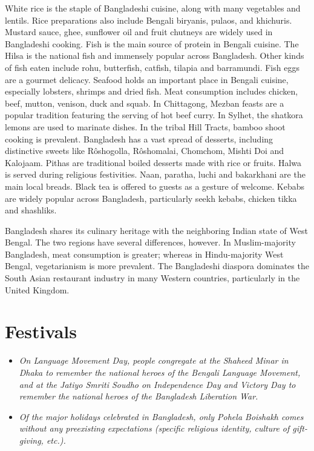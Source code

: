 White rice is the staple of Bangladeshi cuisine, along with many
vegetables and lentils. Rice preparations also include Bengali biryanis,
pulaos, and khichuris. Mustard sauce, ghee, sunflower oil and fruit
chutneys are widely used in Bangladeshi cooking. Fish is the main source
of protein in Bengali cuisine. The Hilsa is the national fish and
immensely popular across Bangladesh. Other kinds of fish eaten include
rohu, butterfish, catfish, tilapia and barramundi. Fish eggs are a
gourmet delicacy. Seafood holds an important place in Bengali cuisine,
especially lobsters, shrimps and dried fish. Meat consumption includes
chicken, beef, mutton, venison, duck and squab. In Chittagong, Mezban
feasts are a popular tradition featuring the serving of hot beef curry.
In Sylhet, the shatkora lemons are used to marinate dishes. In the
tribal Hill Tracts, bamboo shoot cooking is prevalent. Bangladesh has a
vast spread of desserts, including distinctive sweets like Rôshogolla,
Rôshomalai, Chomchom, Mishti Doi and Kalojaam. Pithas are traditional
boiled desserts made with rice or fruits. Halwa is served during
religious festivities. Naan, paratha, luchi and bakarkhani are the main
local breads. Black tea is offered to guests as a gesture of welcome.
Kebabs are widely popular across Bangladesh, particularly seekh kebabs,
chicken tikka and shashliks.

Bangladesh shares its culinary heritage with the neighboring Indian
state of West Bengal. The two regions have several differences, however.
In Muslim-majority Bangladesh, meat consumption is greater; whereas in
Hindu-majority West Bengal, vegetarianism is more prevalent. The
Bangladeshi diaspora dominates the South Asian restaurant industry in
many Western countries, particularly in the United Kingdom.

\section{Festivals}\label{festivals}

\begin{itemize}
\item
  \emph{On Language Movement Day, people congregate at the Shaheed Minar
  in Dhaka to remember the national heroes of the Bengali Language
  Movement, and at the Jatiyo Smriti Soudho on Independence Day and
  Victory Day to remember the national heroes of the Bangladesh
  Liberation War.}
\item
  \emph{Of the major holidays celebrated in Bangladesh, only Pohela
  Boishakh comes without any preexisting expectations (specific
  religious identity, culture of gift-giving, etc.).}
\end{itemize}

